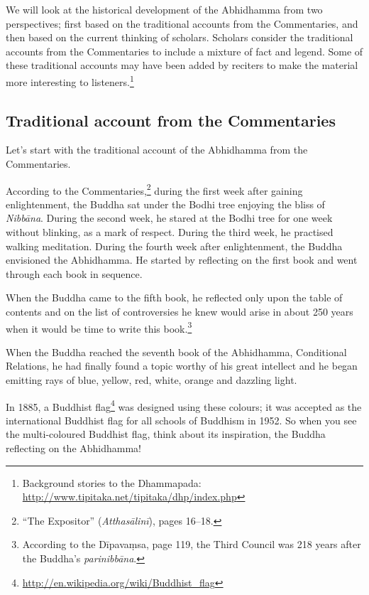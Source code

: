 \pagebreak

We will look at the historical development of the Abhidhamma from two perspectives; first based on the traditional accounts from the Commentaries, and then based on the current thinking of scholars. Scholars consider the traditional accounts from the Commentaries to include a mixture of fact and legend. Some of these traditional accounts may have been added by reciters to make the material more interesting to listeners.\footnote{Background stories to the Dhammapada: \url{http://www.tipitaka.net/tipitaka/dhp/index.php}}

\subsection*{Traditional account from the Commentaries}

Let’s start with the traditional account of the Abhidhamma from the Commentaries. 

According to the Commentaries,\footnote{“The Expositor” (\textit{Atthasālinī}), pages 16--18.} during the first week after gaining enlightenment, the Buddha sat under the Bodhi tree enjoying the bliss of \textit{Nibbāna}. During the second week, he stared at the Bodhi tree for one week without blinking, as a mark of respect. During the third week, he practised walking meditation. During the fourth week after enlightenment, the Buddha envisioned the Abhidhamma. He started by reflecting on the first book and went through each book in sequence. 

When the Buddha came to the fifth book, he reflected only upon the table of contents and on the list of controversies he knew would arise in about 250 years when it would be time to write this book.\footnote{According to the Dīpavaṃsa, page 119, the Third Council was 218 years after the Buddha's \textit{parinibbāna}.}

When the Buddha reached the seventh book of the Abhidhamma, Conditional Relations, he had finally found a topic worthy of his great intellect and he began emitting rays of blue, yellow, red, white, orange and dazzling light. 

In 1885, a Buddhist flag\footnote{\url{http://en.wikipedia.org/wiki/Buddhist_flag}} was designed using these colours; it was accepted as the international Buddhist flag for all schools of Buddhism in 1952. So when you see the multi-coloured Buddhist flag, think about its inspiration, the Buddha reflecting on the Abhidhamma!

